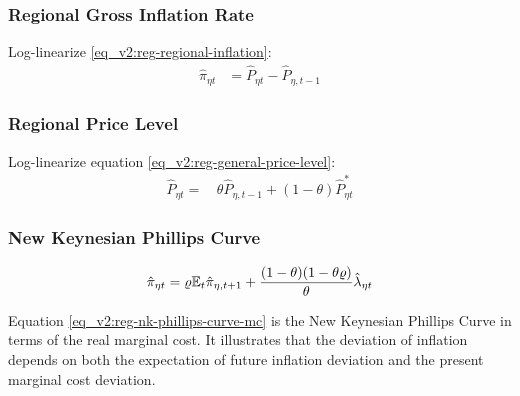 \documentclass[../thesis.tex]{subfiles}
\begin{document}

\subsubsection*{Regional Gross Inflation Rate}

Log-linearize \ref{eq_v2:reg-regional-inflation}:
\begin{align}
	\hat{\pi}_{\eta t} &= \hat{P}_{\eta t} - \hat{P}_{\eta, t-1}
	\label{eq_v2:level-dev-regional-inflation}
\end{align}


\subsubsection*{Regional Price Level}

Log-linearize equation \ref{eq_v2:reg-general-price-level}:
\begin{align}
	\hat{P}_{\eta t} =\, &\theta \hat{P}_{\eta, t-1} + (1-\theta) \hat{P}_{\eta t}^{\ast} \label{eq_v2:reg-ll-general-price-level}
\end{align}


\subsubsection*{New Keynesian Phillips Curve}

\begin{align}
	\hat{\pi}_{\eta t} = \varrho {\mathbb{E}_{t}} \hat{\pi}_{\eta, t+1} + \frac{(1-\theta) (1- \theta \varrho)}{\theta} \hat{\lambda}_{\eta t} \label{eq_v2:reg-nk-phillips-curve-mc}
\end{align}

Equation \ref{eq_v2:reg-nk-phillips-curve-mc} is the New Keynesian Phillips Curve in terms of the real marginal cost. It illustrates that the deviation of inflation depends on both the expectation of future inflation deviation and the present marginal cost deviation.

\end{document}
